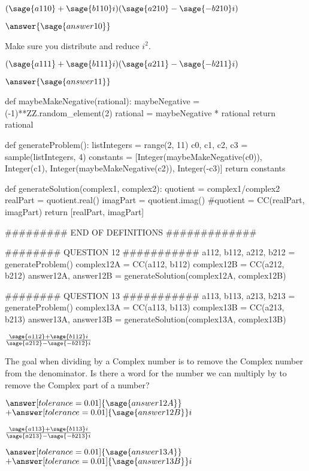 \documentclass{ximera}
\begin{document}
\begin{exercise}
$(\sage{a110}+\sage{b110}i)(\sage{a210}-\sage{-b210}i)$

$\answer{\sage{answer10}}$

\begin{hint}
Make sure you distribute and reduce $i^2$.
\end{hint}
\end{exercise}

\begin{exercise}
	$(\sage{a111}+\sage{b111}i)(\sage{a211}-\sage{-b211}i)$

	$\answer{\sage{answer11}}$
\end{exercise}

\begin{sagesilent}
def maybeMakeNegative(rational):
    maybeNegative = (-1)**ZZ.random_element(2)
    rational = maybeNegative * rational
    return rational

def generateProblem():
    listIntegers = range(2, 11)
    c0, c1, c2, c3 = sample(listIntegers, 4)
    constants = [Integer(maybeMakeNegative(c0)), Integer(c1), Integer(maybeMakeNegative(c2)), Integer(-c3)]
    return constants

def generateSolution(complex1, complex2):
    quotient = complex1/complex2
    realPart = quotient.real()
    imagPart = quotient.imag()
    #quotient = CC(realPart, imagPart)
    return [realPart, imagPart]

######### END OF DEFINITIONS #############

######## QUESTION 12 ###########
a112, b112, a212, b212 = generateProblem()
complex12A = CC(a112, b112)
complex12B = CC(a212, b212)
answer12A, answer12B = generateSolution(complex12A, complex12B)

######## QUESTION 13 ###########
a113, b113, a213, b213 = generateProblem()
complex13A = CC(a113, b113)
complex13B = CC(a213, b213)
answer13A, answer13B = generateSolution(complex13A, complex13B)
\end{sagesilent}

\begin{exercise}
	$\frac{\sage{a112}+\sage{b112}i}{\sage{a212}-\sage{-b212}i}$

\begin{hint}
The goal when dividing by a Complex number is to remove the Complex number from the denominator. Is there a word for the number we can multiply by to remove the Complex part of a number?
\end{hint}

	$\answer[tolerance=0.01]{\sage{answer12A}}$ $+ \answer[tolerance=0.01]{\sage{answer12B}}i$
\end{exercise}

\begin{exercise}
	$\frac{\sage{a113}+\sage{b113}i}{\sage{a213}-\sage{-b213}i}$

	$\answer[tolerance=0.01]{\sage{answer13A}}$ $+ \answer[tolerance=0.01]{\sage{answer13B}}i$
\end{exercise}
\end{document}
